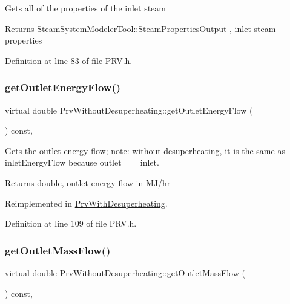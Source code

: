 Gets all of the properties of the inlet steam \begin{DoxyReturn}{Returns}
\hyperlink{struct_steam_system_modeler_tool_1_1_steam_properties_output}{Steam\+System\+Modeler\+Tool\+::\+Steam\+Properties\+Output} , inlet steam properties 
\end{DoxyReturn}


Definition at line 83 of file P\+R\+V.\+h.

\mbox{\label{class_prv_without_desuperheating_a6529a68ffa444ae87c890b2bcbc2cc84}} 
\subsubsection{\texorpdfstring{get\+Outlet\+Energy\+Flow()}{getOutletEnergyFlow()}}
{\footnotesize\ttfamily virtual double Prv\+Without\+Desuperheating\+::get\+Outlet\+Energy\+Flow (\begin{DoxyParamCaption}{ }\end{DoxyParamCaption}) const\hspace{0.3cm}{\ttfamily [inline]}, {\ttfamily [virtual]}}

Gets the outlet energy flow; note\+: without desuperheating, it is the same as inlet\+Energy\+Flow because outlet == inlet. \begin{DoxyReturn}{Returns}
double, outlet energy flow in M\+J/hr 
\end{DoxyReturn}


Reimplemented in \hyperlink{class_prv_with_desuperheating_aa6e9bbb28c565ba8f7770f69ace33ab3}{Prv\+With\+Desuperheating}.



Definition at line 109 of file P\+R\+V.\+h.

\mbox{\label{class_prv_without_desuperheating_aefe4227f2c01209ba4ce79f6b5825d73}} 
\subsubsection{\texorpdfstring{get\+Outlet\+Mass\+Flow()}{getOutletMassFlow()}}
{\footnotesize\ttfamily virtual double Prv\+Without\+Desuperheating\+::get\+Outlet\+Mass\+Flow (\begin{DoxyParamCaption}{ }\end{DoxyParamCaption}) const\hspace{0.3cm}{\ttfamily [inline]}, {\ttfamily [virtual]}}

